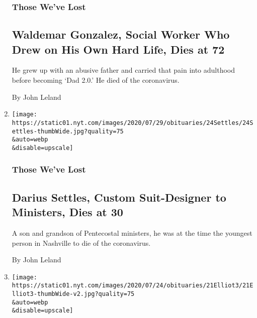 \begin{enumerate}
  \hypertarget{those-weve-lost-1}{%
  \subsubsection{Those We've Lost}\label{those-weve-lost-1}}

  \hypertarget{waldemar-gonzalez-social-worker-who-drew-on-his-own-hard-life-dies-at-72}{%
  \subsection{Waldemar Gonzalez, Social Worker Who Drew on His Own Hard
  Life, Dies at
  72}\label{waldemar-gonzalez-social-worker-who-drew-on-his-own-hard-life-dies-at-72}}

  He grew up with an abusive father and carried that pain into adulthood
  before becoming `Dad 2.0.' He died of the coronavirus.

  By John Leland
\item
  \href{/2020/07/27/obituaries/darius-settles-dead-coronavirus.html}{}

  \texttt{[image: https://static01.nyt.com/images/2020/07/29/obituaries/24Settles/24Settles-thumbWide.jpg?quality=75\\\&auto=webp\\\&disable=upscale]}

  \hypertarget{those-weve-lost-2}{%
  \subsubsection{Those We've Lost}\label{those-weve-lost-2}}

  \hypertarget{darius-settles-custom-suit-designer-to-ministers-dies-at-30}{%
  \subsection{Darius Settles, Custom Suit-Designer to Ministers, Dies at
  30}\label{darius-settles-custom-suit-designer-to-ministers-dies-at-30}}

  A son and grandson of Pentecostal ministers, he was at the time the
  youngest person in Nashville to die of the coronavirus.

  By John Leland
\item
  \href{/2020/07/22/arts/tony-elliott-time-out-founder-dead.html}{}

  \texttt{[image: https://static01.nyt.com/images/2020/07/24/obituaries/21Elliot3/21Elliot3-thumbWide-v2.jpg?quality=75\\\&auto=webp\\\&disable=upscale]}

  \hypertarget{tony-elliott-whose-time-out-clued-readers-in-dies-at-73}{%
}
\end{enumerate}
